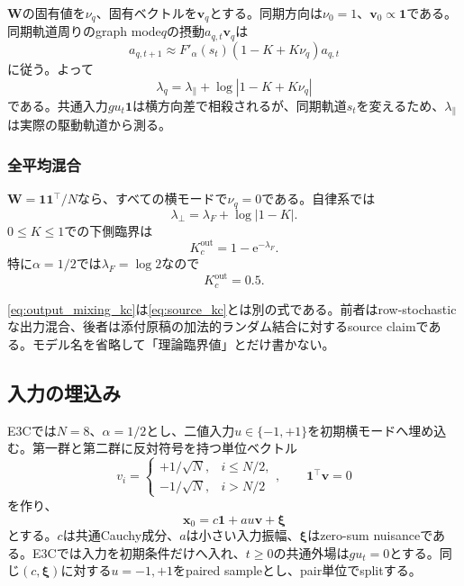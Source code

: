 \documentclass[a4paper,11pt,oneside,openany]{ltjsbook}
\newcommand{\e}{\mathrm{e}}
\newcommand{\ones}{\bm{1}}
\newcommand{\vect}[1]{\bm{#1}}
\newcommand{\mat}[1]{\bm{#1}}
\begin{document}
\(\mat W\)の固有値を\(\nu_q\)、固有ベクトルを\(\vect v_q\)とする。同期方向は\(\nu_0=1\)、\(\vect v_0\propto\ones\)である。同期軌道周りのgraph mode\(q\)の摂動\(a_{q,t}\vect v_q\)は
\begin{equation}
  a_{q,t+1}
  \approx F'_\alpha(s_t)
  \left(1-K+K\nu_q\right)a_{q,t}
  \label{eq:graph_mode_variational}
\end{equation}
に従う。よって
\begin{equation}
  \lambda_q
  =\lambda_\parallel
   +\log|1-K+K\nu_q|
  \label{eq:graph_mode_lyapunov}
\end{equation}
である。共通入力\(gu_t\ones\)は横方向差で相殺されるが、同期軌道\(s_t\)を変えるため、\(\lambda_\parallel\)は実際の駆動軌道から測る。

\subsubsection*{全平均混合}
\(\mat W=\ones\ones^\top/N\)なら、すべての横モードで\(\nu_q=0\)である。自律系では
\begin{equation}
  \lambda_\perp
  =\lambda_F+\log|1-K|.
  \label{eq:meanfield_output_transverse}
\end{equation}
\(0\le K\le1\)での下側臨界は
\begin{equation}
  K_c^{\mathrm{out}}
  =1-\e^{-\lambda_F}.
  \label{eq:output_mixing_kc}
\end{equation}
特に\(\alpha=1/2\)では\(\lambda_F=\log2\)なので
\begin{equation}
  K_c^{\mathrm{out}}=0.5.
  \label{eq:output_mixing_kc_half}
\end{equation}

\begin{cautionbox}
\cref{eq:output_mixing_kc}は\cref{eq:source_kc}とは別の式である。前者はrow-stochasticな出力混合、後者は添付原稿の加法的ランダム結合に対するsource claimである。モデル名を省略して「理論臨界値」とだけ書かない。
\end{cautionbox}

\subsection{入力の埋込み}

E3Cでは\(N=8\)、\(\alpha=1/2\)とし、二値入力\(u\in\{-1,+1\}\)を初期横モードへ埋め込む。第一群と第二群に反対符号を持つ単位ベクトル
\begin{equation}
  v_i=
  \begin{cases}
    +1/\sqrt N,&i\le N/2,\\
    -1/\sqrt N,&i>N/2
  \end{cases},
  \qquad \ones^\top\vect v=0
  \label{eq:contrast_graph_mode}
\end{equation}
を作り、
\begin{equation}
  \vect x_0
  =c\ones+a u\vect v+\vect\xi
  \label{eq:e3c_initial_encoding}
\end{equation}
とする。\(c\)は共通Cauchy成分、\(a\)は小さい入力振幅、\(\vect\xi\)はzero-sum nuisanceである。E3Cでは入力を初期条件だけへ入れ、\(t\ge0\)の共通外場は\(g u_t=0\)とする。同じ\((c,\vect\xi)\)に対する\(u=-1,+1\)をpaired sampleとし、pair単位でsplitする。
\end{document}
